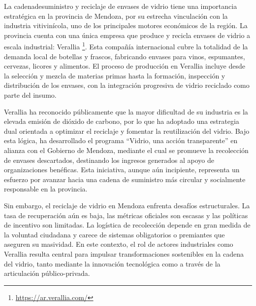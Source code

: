La \gls{cadenadesuministro} y reciclaje de envases de vidrio tiene una importancia estratégica en la provincia de Mendoza, por su estrecha vinculación con la industria vitivinícola, uno de los principales motores económicos de la región. La provincia cuenta con una única empresa que produce y recicla envases de vidrio a escala industrial: Verallia \footnote{\url{https://ar.verallia.com/}}. Esta compañía internacional cubre la totalidad de la demanda local de botellas y frascos, fabricando envases para vinos, espumantes, cervezas, licores y alimentos. El proceso de producción en Verallia incluye desde la selección y mezcla de materias primas hasta la formación, inspección y distribución de los envases, con la integración progresiva de vidrio reciclado como parte del insumo.

Verallia ha reconocido públicamente que la mayor dificultad de su industria es la elevada emisión de dióxido de carbono, por lo que ha adoptado una estrategia dual orientada a optimizar el reciclaje y fomentar la reutilización del vidrio. Bajo esta lógica, ha desarrollado el programa ``Vidrio, una acción transparente'' en alianza con el Gobierno de Mendoza, mediante el cual se promueve la recolección de envases descartados, destinando los ingresos generados al apoyo de organizaciones benéficas. Esta iniciativa, aunque aún incipiente, representa un esfuerzo por avanzar hacia una cadena de suministro más circular y socialmente responsable en la provincia.

Sin embargo, el reciclaje de vidrio en Mendoza enfrenta desafíos estructurales. La tasa de recuperación aún es baja, las métricas oficiales son escasas y las políticas de incentivo son limitadas. La logística de recolección depende en gran medida de la voluntad ciudadana y carece de sistemas obligatorios o premiantes que aseguren su masividad. En este contexto, el rol de actores industriales como Verallia resulta central para impulsar transformaciones sostenibles en la cadena del vidrio, tanto mediante la innovación tecnológica como a través de la articulación público-privada.


